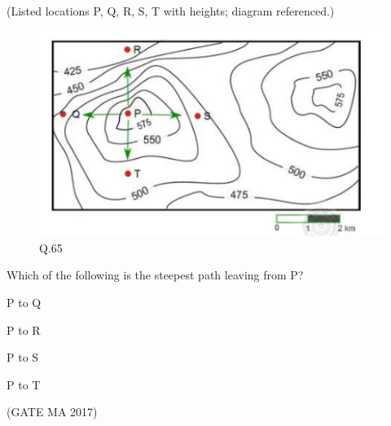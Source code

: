 \documentclass[journal,12pt,onecolumn]{IEEEtran}
\theoremstyle{remark}
\begin{document}
\begin{enumerate}
(Listed locations P, Q, R, S, T with heights; diagram referenced.)
\begin{figure}[H]
    \centering
    \includegraphics[width=0.5\columnwidth]{Figs/fig1.png}
    \caption{Q.65}
    \label{fig:q65}
\end{figure}
Which of the following is the steepest path leaving from P?
\begin{enumerate}
\begin{multicols}{2}
\item P to Q
\item P to R
\item P to S
\item P to T
\end{multicols}
\end{enumerate}
\hfill (GATE MA 2017)

\end{enumerate}
\end{document}
